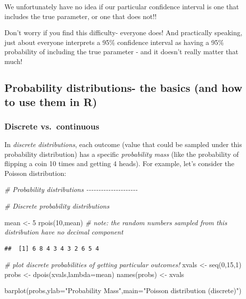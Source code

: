 \documentclass[
]{article}
\newenvironment{Shaded}{\begin{snugshade}}{\end{snugshade}}
\newcommand{\AttributeTok}[1]{\textcolor[rgb]{0.77,0.63,0.00}{#1}}
\newcommand{\CommentTok}[1]{\textcolor[rgb]{0.56,0.35,0.01}{\textit{#1}}}
\newcommand{\DecValTok}[1]{\textcolor[rgb]{0.00,0.00,0.81}{#1}}
\newcommand{\FunctionTok}[1]{\textcolor[rgb]{0.00,0.00,0.00}{#1}}
\newcommand{\NormalTok}[1]{#1}
\newcommand{\OtherTok}[1]{\textcolor[rgb]{0.56,0.35,0.01}{#1}}
\newcommand{\StringTok}[1]{\textcolor[rgb]{0.31,0.60,0.02}{#1}}
\begin{document}
We unfortunately have no idea if our particular confidence interval is
one that includes the true parameter, or one that does not!!

Don't worry if you find this difficulty- everyone does! And practically
speaking, just about everyone interprets a 95\% confidence interval as
having a 95\% probability of including the true parameter - and it
doesn't really matter that much!

\hypertarget{probability-distributions--the-basics-and-how-to-use-them-in-r}{%
\subsection{Probability distributions- the basics (and how to use them
in
R)}\label{probability-distributions--the-basics-and-how-to-use-them-in-r}}

\hypertarget{discrete-vs.-continuous}{%
\subsubsection{Discrete vs.~continuous}\label{discrete-vs.-continuous}}

In \emph{discrete distributions}, each outcome (value that could be
sampled under this probability distribution) has a specific
\emph{probability mass} (like the probability of flipping a coin 10
times and getting 4 heads). For example, let's consider the Poisson
distribution:

\begin{Shaded}
\begin{Highlighting}[]
\CommentTok{\# Probability distributions {-}{-}{-}{-}{-}{-}{-}{-}{-}{-}{-}{-}{-}{-}{-}{-}{-}{-}{-}{-}{-}}

\CommentTok{\# Discrete probability distributions }

\NormalTok{mean }\OtherTok{\textless{}{-}} \DecValTok{5}
\FunctionTok{rpois}\NormalTok{(}\DecValTok{10}\NormalTok{,mean)    }\CommentTok{\# note: the random numbers sampled from this distribution have no decimal component}
\end{Highlighting}
\end{Shaded}

\begin{verbatim}
##  [1] 6 8 4 3 4 3 2 6 5 4
\end{verbatim}

\begin{Shaded}
\begin{Highlighting}[]
             \CommentTok{\# plot discrete probabilities of getting particular outcomes!}
\NormalTok{xvals }\OtherTok{\textless{}{-}} \FunctionTok{seq}\NormalTok{(}\DecValTok{0}\NormalTok{,}\DecValTok{15}\NormalTok{,}\DecValTok{1}\NormalTok{)}
\NormalTok{probs }\OtherTok{\textless{}{-}} \FunctionTok{dpois}\NormalTok{(xvals,}\AttributeTok{lambda=}\NormalTok{mean)}
\FunctionTok{names}\NormalTok{(probs) }\OtherTok{\textless{}{-}}\NormalTok{ xvals}
               
\FunctionTok{barplot}\NormalTok{(probs,}\AttributeTok{ylab=}\StringTok{"Probability Mass"}\NormalTok{,}\AttributeTok{main=}\StringTok{"Poisson distribution (discrete)"}\NormalTok{)}
\end{Highlighting}
\end{Shaded}
\end{document}
